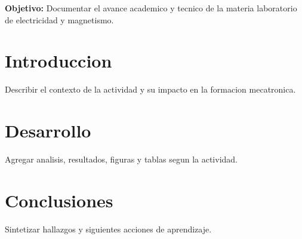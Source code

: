 \documentclass[spanish,letterpaper,oneside]{article}
\begin{document}
\templatePortrait
\templatePagecfg
\onehalfspacing

\begin{abstractd}
\textbf{Objetivo:} Documentar el avance academico y tecnico de la materia laboratorio de electricidad y magnetismo.
\end{abstractd}

\templateIndex
\templateFinalcfg

\section{Introduccion}
Describir el contexto de la actividad y su impacto en la formacion mecatronica.

\section{Desarrollo}
Agregar analisis, resultados, figuras y tablas segun la actividad.

\section{Conclusiones}
Sintetizar hallazgos y siguientes acciones de aprendizaje.



\end{document}

